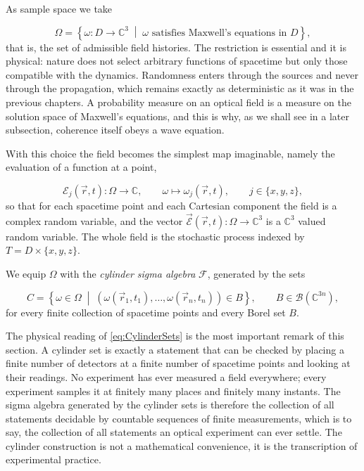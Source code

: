 		As sample space we take

		\begin{equation}\label{eq:FieldSampleSpace}
			\Omega = \left\{\omega : D\to\mathbb{C}^{3} \;\middle|\; \omega \text{ satisfies Maxwell's equations in } D\right\},
		\end{equation}
		that is, the set of admissible field histories. The restriction is essential and it is
		physical: nature does not select arbitrary functions of spacetime but only those
		compatible with the dynamics. Randomness enters through the sources and never
		through the propagation, which remains exactly as deterministic as it was in the
		previous chapters. A probability measure on an optical field is a measure on the
		solution space of Maxwell's equations, and this is why, as we shall see in a later
		subsection, coherence itself obeys a wave equation.

		With this choice the field becomes the simplest map imaginable, namely the evaluation of
		a function at a point,

		\begin{equation}\label{eq:EvaluationMap}
			\mathcal{E}_{j}(\vec{r},t) : \Omega\to\mathbb{C}, \qquad \omega\mapsto\omega_{j}(\vec{r},t),
			\qquad j\in\{x,y,z\},
		\end{equation}
		so that for each spacetime point and each Cartesian component the field is a complex
		random variable, and the vector $\vec{\mathcal{E}}(\vec{r},t):\Omega\to\mathbb{C}^{3}$
		is a $\mathbb{C}^{3}$ valued random variable. The whole field is the stochastic process
		indexed by $T = D\times\{x,y,z\}$.

		We equip $\Omega$ with the \emph{cylinder sigma algebra}
		$\mathcal{F}$, generated by the sets

		\begin{equation}\label{eq:CylinderSets}
			C = \left\{\omega\in\Omega \;\middle|\; \left(\omega(\vec{r}_{1},t_{1}),\dots,\omega(\vec{r}_{n},t_{n})\right)\in B\right\},
			\qquad B\in\mathcal{B}(\mathbb{C}^{3n}),
		\end{equation}
		for every finite collection of spacetime points and every Borel set $B$.

		The physical reading of \eqref{eq:CylinderSets} is the most important remark of this
		section. A cylinder set is exactly a statement that can be checked by placing a
		finite number of detectors at a finite number of spacetime points and looking at their
		readings. No experiment has ever measured a field everywhere; every experiment samples
		it at finitely many places and finitely many instants. The sigma algebra generated by
		the cylinder sets is therefore the collection of all statements decidable by countable
		sequences of finite measurements, which is to say, the collection of all statements an
		optical experiment can ever settle. The cylinder construction is not a mathematical
		convenience, it is the transcription of experimental practice.

